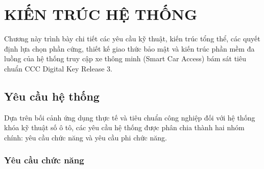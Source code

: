 \newpage
\chapter{\MakeUppercase{KIẾN TRÚC HỆ THỐNG}}

Chương này trình bày chi tiết các yêu cầu kỹ thuật, kiến trúc tổng thể, các quyết định lựa chọn phần cứng, thiết kế giao thức bảo mật và kiến trúc phần mềm đa luồng của hệ thống truy cập xe thông minh (Smart Car Access) bám sát tiêu chuẩn CCC Digital Key Release 3.

\section{Yêu cầu hệ thống}

Dựa trên bối cảnh ứng dụng thực tế và tiêu chuẩn công nghiệp đối với hệ thống khóa kỹ thuật số ô tô, các yêu cầu hệ thống được phân chia thành hai nhóm chính: yêu cầu chức năng và yêu cầu phi chức năng.

\subsection{Yêu cầu chức năng}

